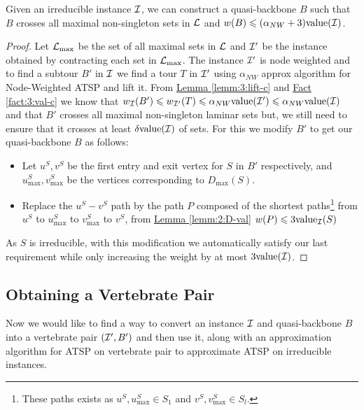 \documentclass[./main.tex]{subfiles}
\begin{document}
	\begin{lemma}\label{lemm:6:q-bb}
		Given an irreducible instance $\mathcal{I}$, we can construct a quasi-backbone $B$ such that $B$ crosses all maximal non-singleton sets in $\mathcal{L}$ and $w(B) \leqslant (\alpha_{NW} + 3)\textup{value}(\mathcal{I})$.
	\end{lemma}
	\begin{proof}
		Let $\mathcal{L}_{\max}$ be the set of all maximal sets in $\mathcal{L}$ and $\mathcal{I}'$ be the instance obtained by contracting each set in $\mathcal{L}_{\max}$. 
		The instance $\mathcal{I}'$ is node weighted and to find a subtour $B'$ in $\mathcal{I}$ we find a tour $T$ in $\mathcal{I}'$ using $\alpha_{NW}$ approx algorithm for Node-Weighted ATSP and lift it. 
		From \hyperref[lemm:3:lift-c]{Lemma \ref{lemm:3:lift-c}} and \hyperref[fact:3:val-c]{Fact \ref{fact:3:val-c}} we know that 
		$w_{\mathcal{I}}(B') \leqslant w_{\mathcal{I}'}(T) \leqslant \alpha_{NW}\textup{value}(\mathcal{I}') \leqslant \alpha_{NW}\textup{value}(\mathcal{I})$ and that $B'$ crosses all maximal non-singleton laminar sets but, we still need to ensure that it crosses at least $\delta\textup{value}(\mathcal{I})$ of sets. For this we modify $B'$ to get our quasi-backbone $B$ as follows:
		\begin{itemize}[-]
			\item Let $u^S, v^S$ be the first entry and exit vertex for $S$ in $B'$ respectively, and $u^S_{\max}, v^S_{\max}$ be the vertices corresponding to $D_{\max}(S)$.
			\item Replace the $u^S - v^S$ path by the path $P$ composed of the shortest paths\footnote{These paths exists as $u^S, u^S_{\max} \in S_1$ and $v^S, v^S_{\max} \in S_l$.} from $u^S$ to $u^S_{\max}$ to $v^S_{\max}$ to $v^S$, from \hyperref[lemm:2:D-val]{Lemma \ref{lemm:2:D-val}} $w(P) \leqslant 3\textup{value}_{\mathcal{I}}(S)$
		\end{itemize}
		As $S$ is irreducible, with this modification we automatically satisfy our last requirement while only increasing the weight by at most $3\textup{value}(\mathcal{I})$.
	\end{proof}
	
	\subsection{Obtaining a Vertebrate Pair}
	Now we would like to find a way to convert an instance $\mathcal{I}$ and quasi-backbone $B$ into a vertebrate pair $(\mathcal{I}', B')$ and then use it, along with an approximation algorithm for ATSP on vertebrate pair to approximate ATSP on irreducible instances.\\
	
\end{document}
